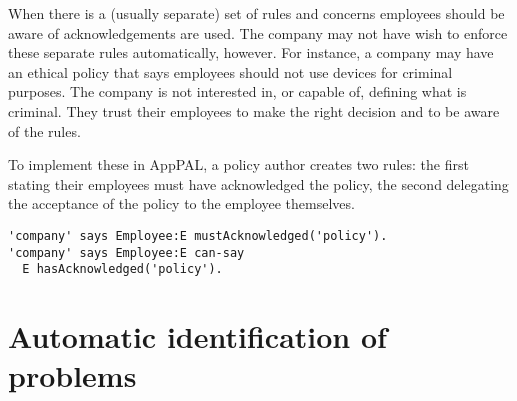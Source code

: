 \documentclass[thesis.tex]{subfiles}
\begin{document}
When there is a (usually separate) set of rules and concerns employees should be aware of acknowledgements are used.
The company may not have wish to enforce these separate rules automatically, however.
For instance, a company may have an ethical policy that says employees should not use devices for criminal purposes.
The company is not interested in, or capable of, defining what is criminal.
They trust their employees to make the right decision and to be aware of the rules.

To implement these in AppPAL, a policy author creates two rules:
  the first stating their employees must have acknowledged the policy,
  the second delegating the acceptance of the policy to the employee themselves.
\begin{lstlisting}
'company' says Employee:E mustAcknowledged('policy').
'company' says Employee:E can-say
  E hasAcknowledged('policy').
\end{lstlisting}

\section{Automatic identification of problems}

%  
\end{document}
